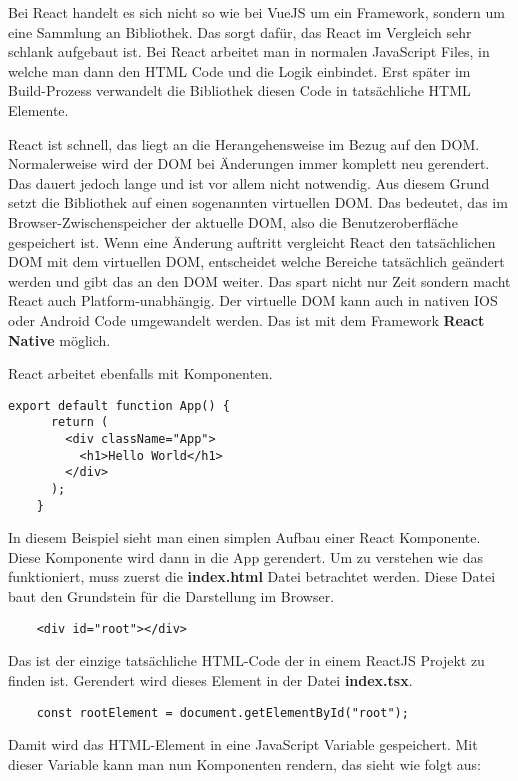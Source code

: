 Bei React handelt es sich nicht so wie bei VueJS um ein Framework, sondern um eine Sammlung an Bibliothek. Das sorgt dafür, das React im Vergleich sehr schlank aufgebaut ist. Bei React arbeitet man in normalen JavaScript Files, in welche man dann den HTML Code und die Logik einbindet. Erst später im Build-Prozess verwandelt die Bibliothek diesen Code in tatsächliche HTML Elemente. 

React ist schnell, das liegt an die Herangehensweise im Bezug auf den DOM. Normalerweise wird der DOM bei Änderungen immer komplett neu gerendert. Das dauert jedoch lange und ist vor allem nicht notwendig. Aus diesem Grund setzt die Bibliothek auf einen sogenannten virtuellen DOM. Das bedeutet, das im Browser-Zwischenspeicher der aktuelle DOM, also die Benutzeroberfläche gespeichert ist. Wenn eine Änderung auftritt vergleicht React den tatsächlichen DOM mit dem virtuellen DOM, entscheidet welche Bereiche tatsächlich geändert werden und gibt das an den DOM weiter. Das spart nicht nur Zeit sondern macht React auch Platform-unabhängig. Der virtuelle DOM kann auch in nativen IOS oder Android Code umgewandelt werden. Das ist mit dem Framework \textbf{React Native} möglich.

React arbeitet ebenfalls mit Komponenten.

\begin{lstlisting}[caption=React Komponente Grundgerüst]
    export default function App() {
      return (
        <div className="App">
          <h1>Hello World</h1>
        </div>
      );
    }
\end{lstlisting}

In diesem Beispiel sieht man einen simplen Aufbau einer React Komponente. Diese Komponente wird dann in die App gerendert. Um zu verstehen wie das funktioniert, muss zuerst die \textbf{index.html} Datei betrachtet werden. Diese Datei baut den Grundstein für die Darstellung im Browser.

\begin{lstlisting}
    <div id="root"></div>
\end{lstlisting}

Das ist der einzige tatsächliche HTML-Code der in einem ReactJS Projekt zu finden ist. Gerendert wird dieses Element in der Datei \textbf{index.tsx}.
\newpage
\begin{lstlisting}
    const rootElement = document.getElementById("root");
\end{lstlisting}

Damit wird das HTML-Element in eine JavaScript Variable gespeichert. Mit dieser Variable kann man nun Komponenten rendern, das sieht wie folgt aus:

